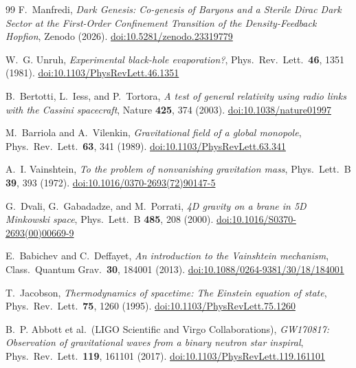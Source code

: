\documentclass[11pt,a4paper]{article}
\theoremstyle{definition}
\theoremstyle{remark}
\begin{document}
\begin{thebibliography}{99}
F.~Manfredi,
\textit{Dark Genesis: Co-genesis of Baryons and a Sterile Dirac Dark Sector
at the First-Order Confinement Transition of the Density-Feedback Hopfion},
Zenodo (2026).
\href{https://doi.org/10.5281/zenodo.23319779}{doi:10.5281/zenodo.23319779}

W.~G. Unruh,
\textit{Experimental black-hole evaporation?},
Phys.\ Rev.\ Lett.\ \textbf{46}, 1351 (1981).
\href{https://doi.org/10.1103/PhysRevLett.46.1351}{doi:10.1103/PhysRevLett.46.1351}

B.~Bertotti, L.~Iess, and P.~Tortora,
\textit{A test of general relativity using radio links with the
Cassini spacecraft},
Nature \textbf{425}, 374 (2003).
\href{https://doi.org/10.1038/nature01997}{doi:10.1038/nature01997}

M.~Barriola and A.~Vilenkin,
\textit{Gravitational field of a global monopole},
Phys.\ Rev.\ Lett.\ \textbf{63}, 341 (1989).
\href{https://doi.org/10.1103/PhysRevLett.63.341}{doi:10.1103/PhysRevLett.63.341}

A.~I. Vainshtein,
\textit{To the problem of nonvanishing gravitation mass},
Phys.\ Lett.\ B \textbf{39}, 393 (1972).
\href{https://doi.org/10.1016/0370-2693(72)90147-5}{doi:10.1016/0370-2693(72)90147-5}

G.~Dvali, G.~Gabadadze, and M.~Porrati,
\textit{4D gravity on a brane in 5D Minkowski space},
Phys.\ Lett.\ B \textbf{485}, 208 (2000).
\href{https://doi.org/10.1016/S0370-2693(00)00669-9}{doi:10.1016/S0370-2693(00)00669-9}

E.~Babichev and C.~Deffayet,
\textit{An introduction to the Vainshtein mechanism},
Class.\ Quantum Grav.\ \textbf{30}, 184001 (2013).
\href{https://doi.org/10.1088/0264-9381/30/18/184001}{doi:10.1088/0264-9381/30/18/184001}

T.~Jacobson,
\textit{Thermodynamics of spacetime: The Einstein equation of state},
Phys.\ Rev.\ Lett.\ \textbf{75}, 1260 (1995).
\href{https://doi.org/10.1103/PhysRevLett.75.1260}{doi:10.1103/PhysRevLett.75.1260}

B.~P. Abbott et al.\ (LIGO Scientific and Virgo Collaborations),
\textit{GW170817: Observation of gravitational waves from a binary
neutron star inspiral},
Phys.\ Rev.\ Lett.\ \textbf{119}, 161101 (2017).
\href{https://doi.org/10.1103/PhysRevLett.119.161101}{doi:10.1103/PhysRevLett.119.161101}


\end{thebibliography}
\end{document}
